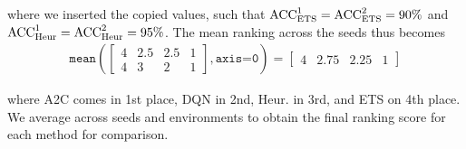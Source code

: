 where we inserted the copied values, such that ${\text{ACC}}_{\text{ETS}}^{1} = {\text{ACC}}_{\text{ETS}}^{2} = 90\%$ and ${\text{ACC}}_{\text{Heur}}^{1} = {\text{ACC}}_{\text{Heur}}^{2} = 95\%$. The mean ranking across the seeds thus becomes
\vspace{2mm}
\begin{align*}
\texttt{mean}
\left(
\begin{bmatrix}
4 & 2.5 & 2.5 & 1 \\[3pt] 
4 & 3 & 2 & 1 
\end{bmatrix}, \texttt{axis=0} \right)
= 
\begin{bmatrix} 4 & 2.75 & 2.25 & 1  \end{bmatrix} 
\end{align*}

where A2C comes in 1st place, DQN in 2nd, Heur. in 3rd, and ETS on 4th place. We average across seeds and environments to obtain the final ranking score for each method for comparison. 

